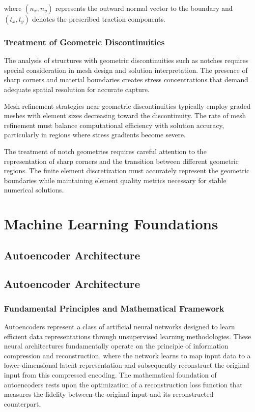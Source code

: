 \documentclass[12pt,a4paper]{report}
\begin{document}
where $(n_x, n_y)$ represents the outward normal vector to the boundary and $(t_x, t_y)$ denotes the prescribed traction components.

\subsubsection{Treatment of Geometric Discontinuities}

The analysis of structures with geometric discontinuities such as notches requires special consideration in mesh design and solution interpretation. The presence of sharp corners and material boundaries creates stress concentrations that demand adequate spatial resolution for accurate capture.

Mesh refinement strategies near geometric discontinuities typically employ graded meshes with element sizes decreasing toward the discontinuity. The rate of mesh refinement must balance computational efficiency with solution accuracy, particularly in regions where stress gradients become severe.

The treatment of notch geometries requires careful attention to the representation of sharp corners and the transition between different geometric regions. The finite element discretization must accurately represent the geometric boundaries while maintaining element quality metrics necessary for stable numerical solutions.


\section{Machine Learning Foundations}
\label{sec:ml_foundations}

\subsection{Autoencoder Architecture}

\subsection*{Autoencoder Architecture}

\subsubsection*{Fundamental Principles and Mathematical Framework}

Autoencoders represent a class of artificial neural networks designed to learn efficient data representations through unsupervised learning methodologies. These neural architectures fundamentally operate on the principle of information compression and reconstruction, where the network learns to map input data to a lower-dimensional latent representation and subsequently reconstruct the original input from this compressed encoding. The mathematical foundation of autoencoders rests upon the optimization of a reconstruction loss function that measures the fidelity between the original input and its reconstructed counterpart.
\end{document}
